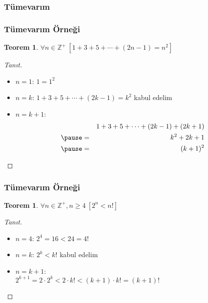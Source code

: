 \documentclass[dvipsnames]{beamer}
\theoremstyle{definition}
\theoremstyle{example}
\theoremstyle{plain}
\newtheorem{teorem}[theorem]{Teorem}
\begin{document}
\begin{frame}
  \frametitle{Tümevarım}

  \begin{center}
  \end{center}
\end{frame}

\begin{frame}
  \frametitle{Tümevarım Örneği}

  \begin{teorem}
    $\forall n \in \mathbb{Z}^+~[1+3+5+\cdots+(2n-1)=n^2]$
  \end{teorem}

  \pause
  \begin{proof}[Tanıt]
    \begin{itemize}
      \item $n=1$: $1=1^2$

      \pause
      \item $n=k$: $1+3+5+\cdots+(2k-1)=k^2$ kabul edelim

      \pause
      \item $n=k+1$:
      \begin{eqnarray*}
        &   & 1+3+5+\cdots+(2k-1)+(2k+1)\\\pause
        & = & k^2+2k+1\\\pause
        & = & (k+1)^2
      \end{eqnarray*}
    \end{itemize}
  \end{proof}
\end{frame}

\begin{frame}
  \frametitle{Tümevarım Örneği}

  \begin{teorem}
    $\forall n \in \mathbb{Z}^+, n \geq 4~[2^n < n!]$
  \end{teorem}

  \pause
  \begin{proof}[Tanıt]
    \begin{itemize}
      \item $n=4$: $2^4=16<24=4!$

      \pause
      \item $n=k$: $2^k < k!$ kabul edelim

      \pause
      \item $n=k+1$:\\
        $2^{k+1} = 2 \cdot 2^k < 2 \cdot k! < (k+1) \cdot k! = (k+1)!$
    \end{itemize}
  \end{proof}
\end{frame}
\end{document}
